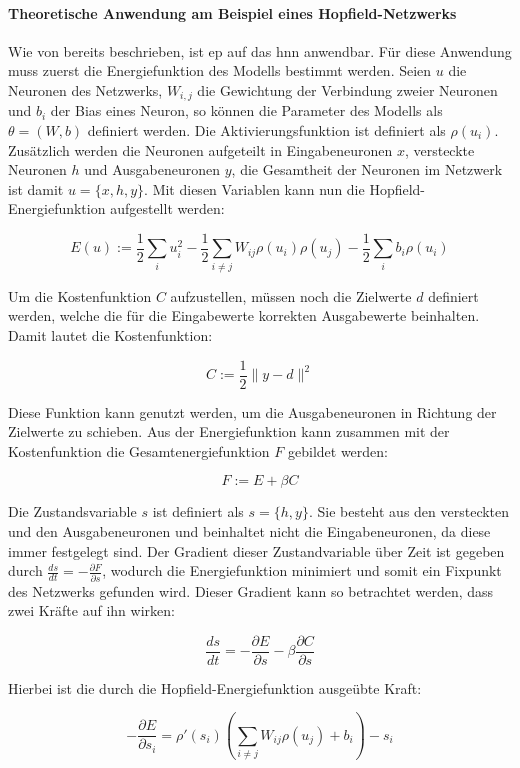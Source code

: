 \paragraph{Theoretische Anwendung am Beispiel eines Hopfield-Netzwerks}
\label{chap:Theoretische Anwendung am Beispiel eines Hopfield-Netzwerks}

Wie von \cite{Scellier2017} bereits beschrieben, ist \ac{ep} auf das \ac{hnn} anwendbar. Für diese Anwendung muss zuerst die Energiefunktion des Modells bestimmt werden. Seien \(u\) die Neuronen des Netzwerks, \(W_{i,j}\) die Gewichtung der Verbindung zweier Neuronen und \(b_i\) der Bias eines Neuron, so können die Parameter des Modells als \(\theta=(W,b)\) definiert werden. Die Aktivierungsfunktion ist definiert als \(\rho(u_i)\). Zusätzlich werden die Neuronen aufgeteilt in Eingabeneuronen \(x\), versteckte Neuronen \(h\) und Ausgabeneuronen \(y\), die Gesamtheit der Neuronen im Netzwerk ist damit \(u=\{x,h,y\}\). Mit diesen Variablen kann nun die Hopfield-Energiefunktion aufgestellt werden:

\[E(u):=\frac{1}{2}\sum_iu_i^2-\frac{1}{2}\sum_{i\neq{j}}W_{ij}\rho(u_i)\rho(u_j)-\frac{1}{2}\sum_ib_i\rho(u_i)\]

Um die Kostenfunktion \(C\) aufzustellen, müssen noch die Zielwerte \(d\) definiert werden, welche die für die Eingabewerte korrekten Ausgabewerte beinhalten. Damit lautet die Kostenfunktion:

\[C:=\frac{1}{2}\|y-d\|^2\]

Diese Funktion kann genutzt werden, um die Ausgabeneuronen in Richtung der Zielwerte zu schieben. Aus der Energiefunktion kann zusammen mit der Kostenfunktion die Gesamtenergiefunktion \(F\) gebildet werden:

\[F:=E+\beta C\]

Die Zustandsvariable \(s\) ist definiert als \(s=\{h,y\}\). Sie besteht aus den versteckten und den Ausgabeneuronen und beinhaltet nicht die Eingabeneuronen, da diese immer festgelegt sind. Der Gradient dieser Zustandvariable über Zeit ist gegeben durch \(\frac{ds}{dt}=-\frac{\partial F}{\partial s}\), wodurch die Energiefunktion minimiert und somit ein Fixpunkt des Netzwerks gefunden wird. Dieser Gradient kann so betrachtet werden, dass zwei Kräfte auf ihn wirken:

\[\frac{ds}{dt}=-\frac{\partial E}{\partial s}-\beta\frac{\partial C}{\partial s}\]

Hierbei ist die durch die Hopfield-Energiefunktion ausgeübte Kraft:

\[-\frac{\partial E}{\partial s_i}=\rho'(s_i)\left(\sum_{i\neq{j}}W_{ij}\rho(u_j)+b_i\right)-s_i\]

